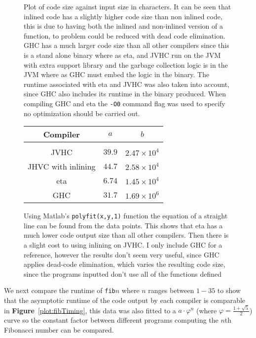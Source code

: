 \documentclass[float=false, crop=false]{standalone}
\newlength\gwidth
\newlength\gheight
\newcommand{\namefig}{\textbf{Figure}~}
\newcommand{\importMGraph}[3]{\setlength{\gwidth}{#2}\setlength{\gheight}{#3}{#1}}
\begin{document}
\begin{figure}
  \centering
  \importMGraph{plotCodeSize.tex}{0.90\textwidth}{0.4\textwidth}
  \caption[Plot of code size as a function of program input size in characters]{
    Plot of code size against input size in characters. It can be  
  seen that inlined code has a slightly higher code size than 
   non inlined code, this is due to having 
   both the inlined and non-inlined version of a function, 
   to problem could be reduced with dead code elimination. 
   GHC has a much larger code size than all other compilers
   since this is a stand alone binary where as eta, and JVHC run 
    on the JVM with extra support library and the garbage collection 
  logic is in the JVM where as GHC must embed the logic in the 
   binary. The runtime associated with eta and JVHC was
    also taken into account, since GHC also includes its runtime
    in the binary produced. When compiling GHC and eta the \texttt{-O0} 
  command flag was used to specify no optimization should be carried out.}
  \label{plot:codeSize}
  \begin{tabular}{ c | c c }
    Compiler& $a$ & $b$\\
    \hline\\
    JVHC & $39.9$ & $2.47 \times 10^{4}$ \\
    JHVC with inlining & $44.7$ & $2.58 \times 10^{4}$\\
    eta & $6.74$ & $1.45 \times 10^{4}$\\
    GHC & $31.7$ & $1.69 \times 10^{6}$
  \end{tabular}
  \caption[Table of regression values for code size as a function of
  program size]{Using Matlab's \texttt{polyfit(x,y,1)} function 
    the equation of a straight line can be found from the data 
    points. This shows that eta has a much lower code output size
    than all other compilers. Then there is a slight 
    cost to using inlining on JVHC. I only include GHC for a reference,
    however the results don't seem very useful, since GHC applies 
    dead-code elimination, which varies the resulting code size, 
    since the programs inputted don't use all of the functions defined}
\end{figure}

We next compare the runtime of \texttt{fib}$n$ where $n$ ranges between 
$1-35$ to show that the asymptotic runtime of the code output
by each compiler is comparable in \namefig\ref{plot:fibTiming}, this data was also fitted to a 
$a \cdot  \varphi^n$ (where $\varphi = \frac{1+\sqrt{5}}{2}$) curve so the  
constant factor between different programs computing
 the $n$th Fibonacci number can be compared. 
\end{document}
